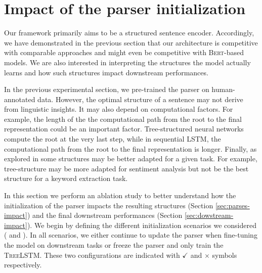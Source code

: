 


\section{Impact of the parser initialization}

Our framework primarily aims to be a structured sentence encoder. Accordingly, we have demonstrated in the previous section that our architecture is competitive with comparable approaches and might even be competitive with \textsc{Bert}-based models. We are also interested in interpreting the structures the model actually learns and how such structures impact downstream performances.

In the previous experimental section, we pre-trained the parser on human-annotated data. %
However, the optimal structure of a sentence may not derive from linguistic insights. It may also depend on computational factors. For example, the length of the the computational path from the root to the final representation could be an important factor. Tree-structured neural networks compute the root at the very last step, while in sequential \textsc{LSTM}, the computational path from the root to the final representation is longer. Finally, as explored in  some structures may be better adapted for a given task. For example, tree-structure may be more adapted for sentiment analysis but not be the best structure for a keyword extraction task.

In this section we perform an ablation study to better understand how the initialization of the parser impacts the resulting structures (Section \ref{sec:parses-impact}) and the final downstream performances (Section \ref{sec:dowstream-impact}). We begin by defining the different initialization scenarios we considered (
and ). In all scenarios, we either continue to update the parser when fine-tuning the model on downstream tasks or freeze the parser and only train the \textsc{TreeLSTM}. These two configurations are indicated with \textbf{$\checkmark$} and \textbf{$\times$} symbols respectively.
% 

